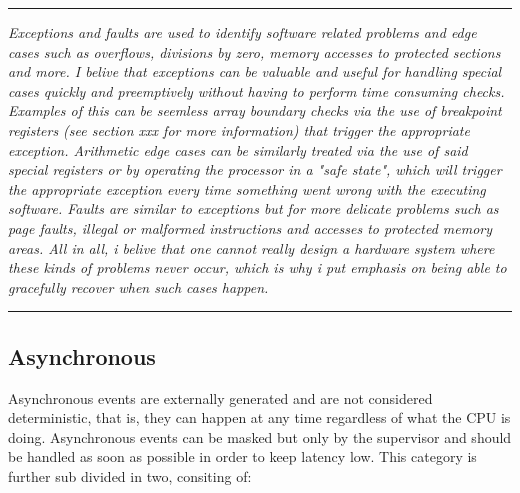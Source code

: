 \documentclass{article}
\begin{document}
        \par\noindent\rule{\textwidth}{0.4pt}
        \textit{Exceptions and faults are used to identify software related problems and edge cases such as overflows, divisions by zero, memory accesses to protected sections and more. I belive that exceptions can be valuable and useful for handling special cases quickly and preemptively without having to perform time consuming checks. Examples of this can be seemless array boundary checks via the use of breakpoint registers (see section xxx for more information) that trigger the appropriate exception. Arithmetic edge cases can be similarly treated via the use of said special registers or by operating the processor in a "safe state", which will trigger the appropriate exception every time something went wrong with the executing software. Faults are similar to exceptions but for more delicate problems such as page faults, illegal or malformed instructions and accesses to protected memory areas. All in all, i belive that one cannot really design a hardware system where these kinds of problems never occur, which is why i put emphasis on being able to gracefully recover when such cases happen.}
        \par\noindent\rule{\textwidth}{0.4pt}

        \subsection{Asynchronous}

            Asynchronous events are externally generated and are not considered deterministic, that is, they can happen at any time regardless of what the CPU is doing. Asynchronous events can be masked but only by the supervisor and should be handled as soon as possible in order to keep latency low. This category is further sub divided in two, consiting of:
\end{document}
